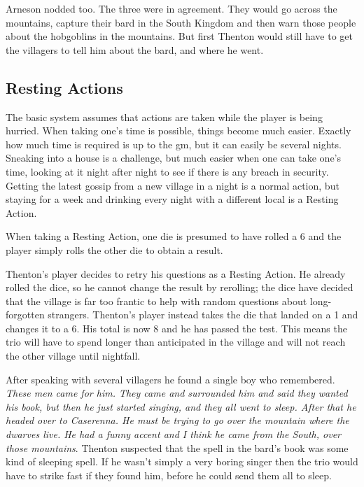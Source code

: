 \documentclass[titlepage,a4paper,openany]{book}
\begin{document}
\begin{multicols}{2}
\begin{exampletext}
Arneson nodded too.
The three were in agreement.
They would go across the mountains, capture their bard in the South Kingdom and then warn those people about the hobgoblins in the mountains.
But first Thenton would still have to get the villagers to tell him about the bard, and where he went.\end{exampletext}

\subsection{Resting Actions}\label{restingactions}

The basic system assumes that actions are taken while the player is being hurried. When taking one's time is possible, things become much easier. Exactly how much time is required is up to the \gls{gm}, but it can easily be several nights. Sneaking into a house is a challenge, but much easier when one can take one's time, looking at it night after night to see if there is any breach in security. Getting the latest gossip from a new village in a night is a normal action, but staying for a week and drinking every night with a different local is a Resting Action.

When taking a Resting Action, one die is presumed to have rolled a 6 and the player simply rolls the other die to obtain a result.

\begin{exampletext}

	Thenton's player decides to retry his questions as a Resting Action. He already rolled the dice, so he cannot change the result by rerolling; the dice have decided that the village is far too frantic to help with random questions about long-forgotten strangers. Thenton's player instead takes the die that landed on a 1 and changes it to a 6. His total is now 8 and he has passed the test. This means the trio will have to spend longer than anticipated in the village and will not reach the other village until nightfall.

	After speaking with several villagers he found a single boy who remembered. \emph{These men came for him. They came and surrounded him and said they wanted his book, but then he just started singing, and they all went to sleep. After that he headed over to Caserenna. He must be trying to go over the mountain where the dwarves live. He had a funny accent and I think he came from the South, over those mountains}. Thenton suspected that the spell in the bard's book was some kind of sleeping spell. If he wasn't simply a very boring singer then the trio would have to strike fast if they found him, before he could send them all to sleep.


\end{exampletext}
\end{multicols}
\end{document}
